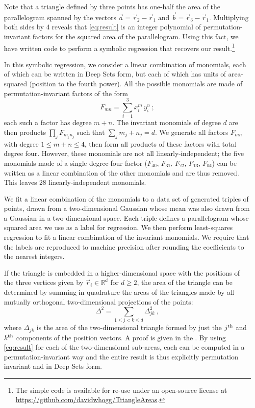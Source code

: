 \documentclass[10pt]{article}
\begin{document}
Note that a triangle defined by three points has one-half the area of the parallelogram spanned by the vectors $\vec{a} = \vec{r}_2 - \vec{r}_1$ and $\vec{b} = \vec{r}_3 - \vec{r}_1$.
Multiplying both sides by 4 reveals that \eqref{eq:result} is an integer polynomial of permutation-invariant factors for the squared area of the parallelogram.
Using this fact, we have written code to perform a symbolic regression that recovers our result.\footnote{
    The simple code is available for re-use under an open-source license at \url{https://github.com/davidwhogg/TriangleAreas}.
}

In this symbolic regression, we consider a linear combination of monomials, each of which can be written in Deep Sets form, but each of which has units of area-squared (position to the fourth power).
All the possible monomials are made of permutation-invariant factors of the form 
\begin{equation}
F_{mn} = \sum_{i=1}^{3} x_i^m \, y_i^n~;
\end{equation}
each such a factor has degree $m + n$.
The invariant monomials of degree $d$ are then products $\prod_j F_{m_j n_j}$ such that $\sum_j m_j + n_j = d$.
We generate all factors $F_{mn}$ with degree $1 \leq m + n \leq 4$, then form all products of these factors with total degree four.
However, these monomials are not all linearly-independent;
the five monomials made of a single degree-four factor ($F_{40}$, $F_{31}$, $F_{22}$, $F_{13}$, $F_{04}$) can be written as a linear combination of the other monomials and are thus removed.
This leaves 28 linearly-independent monomials.

We fit a linear combination of the monomials to a data set of generated triples of points, drawn from a two-dimensional Gaussian whose mean was also drawn from a Gaussian in a two-dimensional space.
Each triple defines a parallelogram whose squared area we use as a label for regression.
We then perform least-squares regression to fit a linear combination of the invariant monomials.
We require that the labels are reproduced to machine precision after rounding the coefficients to the nearest integers.

If the triangle is embedded in a higher-dimensional space with the positions of the three vertices given by $\vec{r}_i \in \mathbb{R}^{d}$ for $d \geq 2$, the area of the triangle can be determined by summing in quadrature the areas of the triangles made by all mutually orthogonal two-dimensional projections of the points:
\begin{equation}
    \Delta^2 = \sum_{1 \leq j < k \leq d} \Delta_{jk}^2~, 
    \label{eq:quadrature}
\end{equation}
where $\Delta_{jk}$ is the area of the two-dimensional triangle formed by just the $j^{\rm th}$ and $k^{\rm th}$ components of the position vectors.
A proof is given in the .
By using \eqref{eq:result} for each of the two-dimensional sub-areas, each can be computed in a permutation-invariant way and the entire result is thus explicitly permutation invariant and in Deep Sets form.
\end{document}
